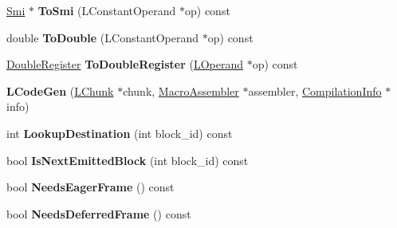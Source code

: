 \begin{DoxyCompactItemize}
\item 
\hyperlink{classv8_1_1internal_1_1_smi}{Smi} $\ast$ {\bfseries To\+Smi} (L\+Constant\+Operand $\ast$op) const \hypertarget{classv8_1_1internal_1_1_l_code_gen_a9aa0394d9bdd7a07b4190d08edb0a8e6}{}\label{classv8_1_1internal_1_1_l_code_gen_a9aa0394d9bdd7a07b4190d08edb0a8e6}

\item 
double {\bfseries To\+Double} (L\+Constant\+Operand $\ast$op) const \hypertarget{classv8_1_1internal_1_1_l_code_gen_a9859cf602181324ec10970ab93416aaa}{}\label{classv8_1_1internal_1_1_l_code_gen_a9859cf602181324ec10970ab93416aaa}

\item 
\hyperlink{structv8_1_1internal_1_1_double_register}{Double\+Register} {\bfseries To\+Double\+Register} (\hyperlink{classv8_1_1internal_1_1_l_operand}{L\+Operand} $\ast$op) const \hypertarget{classv8_1_1internal_1_1_l_code_gen_aad85fae6ac6f5060e2d7b220ab87ede4}{}\label{classv8_1_1internal_1_1_l_code_gen_aad85fae6ac6f5060e2d7b220ab87ede4}

\item 
{\bfseries L\+Code\+Gen} (\hyperlink{classv8_1_1internal_1_1_l_chunk}{L\+Chunk} $\ast$chunk, \hyperlink{classv8_1_1internal_1_1_macro_assembler}{Macro\+Assembler} $\ast$assembler, \hyperlink{classv8_1_1internal_1_1_compilation_info}{Compilation\+Info} $\ast$info)\hypertarget{classv8_1_1internal_1_1_l_code_gen_aed907f71b0a7b9401ce1c0c883ed449b}{}\label{classv8_1_1internal_1_1_l_code_gen_aed907f71b0a7b9401ce1c0c883ed449b}

\item 
int {\bfseries Lookup\+Destination} (int block\+\_\+id) const \hypertarget{classv8_1_1internal_1_1_l_code_gen_aed7b32e45855e787600f16ad151865c4}{}\label{classv8_1_1internal_1_1_l_code_gen_aed7b32e45855e787600f16ad151865c4}

\item 
bool {\bfseries Is\+Next\+Emitted\+Block} (int block\+\_\+id) const \hypertarget{classv8_1_1internal_1_1_l_code_gen_a679c74faee0e58ff843fdfa52dc927a9}{}\label{classv8_1_1internal_1_1_l_code_gen_a679c74faee0e58ff843fdfa52dc927a9}

\item 
bool {\bfseries Needs\+Eager\+Frame} () const \hypertarget{classv8_1_1internal_1_1_l_code_gen_a3487a9e332e1674eeac175bdd43851bd}{}\label{classv8_1_1internal_1_1_l_code_gen_a3487a9e332e1674eeac175bdd43851bd}

\item 
bool {\bfseries Needs\+Deferred\+Frame} () const \hypertarget{classv8_1_1internal_1_1_l_code_gen_aecf1941fcb8a169141d3e26237c64c67}{}\label{classv8_1_1internal_1_1_l_code_gen_aecf1941fcb8a169141d3e26237c64c67}


\end{DoxyCompactItemize}

